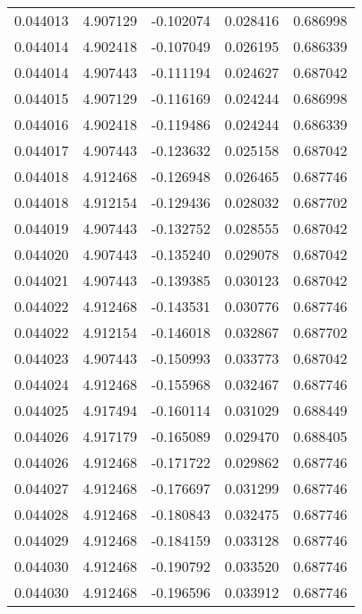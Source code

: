 \begin{tabular}{lrrrr}
0.044013    &  4.907129 & -0.102074 &  0.028416 &             0.686998 \\
0.044014    &  4.902418 & -0.107049 &  0.026195 &             0.686339 \\
0.044014    &  4.907443 & -0.111194 &  0.024627 &             0.687042 \\
0.044015    &  4.907129 & -0.116169 &  0.024244 &             0.686998 \\
0.044016    &  4.902418 & -0.119486 &  0.024244 &             0.686339 \\
0.044017    &  4.907443 & -0.123632 &  0.025158 &             0.687042 \\
0.044018    &  4.912468 & -0.126948 &  0.026465 &             0.687746 \\
0.044018    &  4.912154 & -0.129436 &  0.028032 &             0.687702 \\
0.044019    &  4.907443 & -0.132752 &  0.028555 &             0.687042 \\
0.044020    &  4.907443 & -0.135240 &  0.029078 &             0.687042 \\
0.044021    &  4.907443 & -0.139385 &  0.030123 &             0.687042 \\
0.044022    &  4.912468 & -0.143531 &  0.030776 &             0.687746 \\
0.044022    &  4.912154 & -0.146018 &  0.032867 &             0.687702 \\
0.044023    &  4.907443 & -0.150993 &  0.033773 &             0.687042 \\
0.044024    &  4.912468 & -0.155968 &  0.032467 &             0.687746 \\
0.044025    &  4.917494 & -0.160114 &  0.031029 &             0.688449 \\
0.044026    &  4.917179 & -0.165089 &  0.029470 &             0.688405 \\
0.044026    &  4.912468 & -0.171722 &  0.029862 &             0.687746 \\
0.044027    &  4.912468 & -0.176697 &  0.031299 &             0.687746 \\
0.044028    &  4.912468 & -0.180843 &  0.032475 &             0.687746 \\
0.044029    &  4.912468 & -0.184159 &  0.033128 &             0.687746 \\
0.044030    &  4.912468 & -0.190792 &  0.033520 &             0.687746 \\
0.044030    &  4.912468 & -0.196596 &  0.033912 &             0.687746 \\

\end{tabular}
